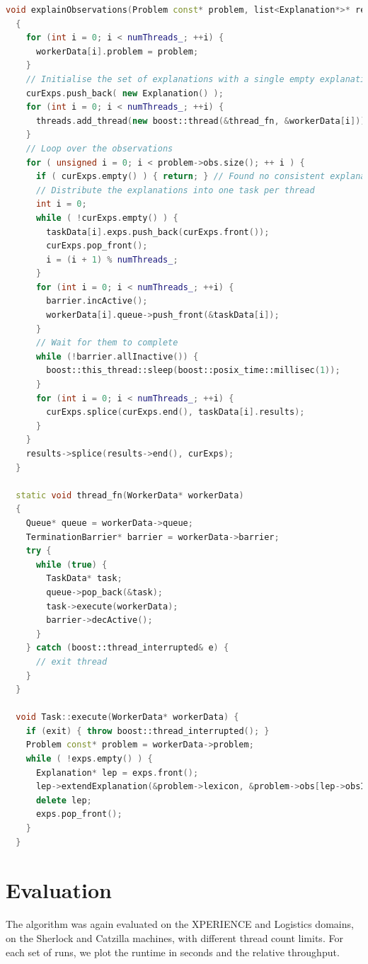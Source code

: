 \documentclass[12pt,twoside,abbrevs,msc,ai,notimes,logo,sansheadings]{infthesis}
\begin{document}
  \begin{lstlisting}[language=C++]
  void explainObservations(Problem const* problem, list<Explanation*>* results)
  {
    for (int i = 0; i < numThreads_; ++i) {
      workerData[i].problem = problem;
    }
    // Initialise the set of explanations with a single empty explanation.
    curExps.push_back( new Explanation() );
    for (int i = 0; i < numThreads_; ++i) {
      threads.add_thread(new boost::thread(&thread_fn, &workerData[i]));
    }
    // Loop over the observations
    for ( unsigned i = 0; i < problem->obs.size(); ++ i ) {
      if ( curExps.empty() ) { return; } // Found no consistent explanations for the observations
      // Distribute the explanations into one task per thread
      int i = 0;
      while ( !curExps.empty() ) {
        taskData[i].exps.push_back(curExps.front());
        curExps.pop_front();
        i = (i + 1) % numThreads_;
      }
      for (int i = 0; i < numThreads_; ++i) {
        barrier.incActive();
        workerData[i].queue->push_front(&taskData[i]);
      }
      // Wait for them to complete
      while (!barrier.allInactive()) {
        boost::this_thread::sleep(boost::posix_time::millisec(1));
      }
      for (int i = 0; i < numThreads_; ++i) {
        curExps.splice(curExps.end(), taskData[i].results);
      }
    }
    results->splice(results->end(), curExps);
  }
  
  static void thread_fn(WorkerData* workerData)
  {
    Queue* queue = workerData->queue;
    TerminationBarrier* barrier = workerData->barrier;
    try {
      while (true) {
        TaskData* task;
        queue->pop_back(&task);
        task->execute(workerData);
        barrier->decActive();
      }
    } catch (boost::thread_interrupted& e) {
      // exit thread
    }
  }
  
  void Task::execute(WorkerData* workerData) {
    if (exit) { throw boost::thread_interrupted(); }
    Problem const* problem = workerData->problem;
    while ( !exps.empty() ) {
      Explanation* lep = exps.front();
      lep->extendExplanation(&problem->lexicon, &problem->obs[lep->obsIndex], &results);
      delete lep;
      exps.pop_front();
    }
  }
  \end{lstlisting}

  
  \section{Evaluation}
  
  The algorithm was again evaluated on the XPERIENCE and Logistics domains, on the Sherlock and Catzilla machines, with different thread count limits. For each set of runs, we plot the runtime in seconds and the relative throughput.
  
\end{document}
